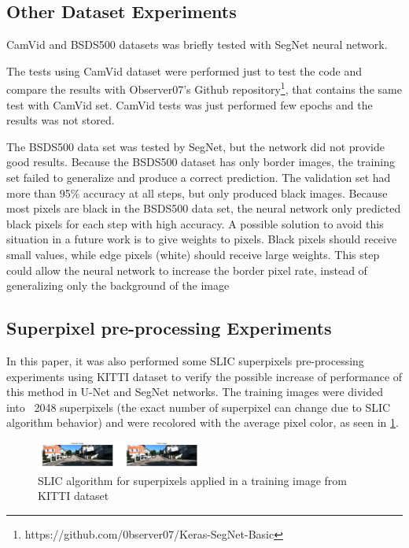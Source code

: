 \documentclass[10pt,twocolumn,letterpaper]{article}
\begin{document}
\subsection{Other Dataset Experiments} \label{ssec:other_experiments}

CamVid and BSDS500 datasets was briefly tested with SegNet neural network. 

The tests using CamVid dataset were performed just to test the code and compare the results with Observer07's Github repository\footnote{https://github.com/0bserver07/Keras-SegNet-Basic}, that contains the same test with CamVid set. CamVid tests was just performed few epochs and the results was not stored.

The BSDS500 data set was tested by SegNet, but the network did not provide good results. Because the BSDS500 dataset has only border images, the training set failed to generalize and produce a correct prediction. The validation set had more than 95\% accuracy at all steps, but only produced black images. Because most pixels are black in the BSDS500 data set, the neural network only predicted black pixels for each step with high accuracy. A possible solution to avoid this situation in a future work is to give weights to pixels. Black pixels should receive small values, while edge pixels (white) should receive large weights. This step could allow the neural network to increase the border pixel rate, instead of generalizing only the background of the image

\subsection{Superpixel pre-processing Experiments} \label{ssec:superpixel_experiments}

In this paper, it was also performed some SLIC superpixels pre-processing experiments using KITTI dataset to verify the possible increase of performance of this method in U-Net and SegNet networks. The training images were divided into ~2048 superpixels (the exact number of superpixel can change due to SLIC algorithm behavior) and were recolored with the average pixel color, as seen in \ref{fig:kitt_superpixels}. 

\begin{figure}[ht]
  \centering
  \includegraphics[width=0.48\textwidth]{kitti_superpixels.png}
  \caption{SLIC algorithm for superpixels applied in a training image from KITTI dataset}
  \label{fig:kitt_superpixels}
\end{figure} 
\end{document}
